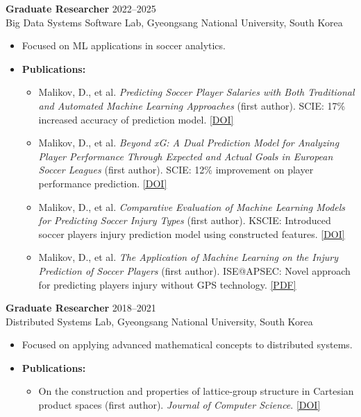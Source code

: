 \documentclass[11pt,a4paper]{article}
\begin{document}
\textbf{Graduate Researcher} \hfill 2022--2025 \\
Big Data Systems Software Lab, Gyeongsang National University, South Korea
\begin{itemize}
    \item Focused on ML applications in soccer analytics.
    \item \textbf{Publications:}
    \begin{itemize}
        \item Malikov, D., et al. \textit{Predicting Soccer Player Salaries with Both Traditional and Automated Machine Learning Approaches} (first author). SCIE: 17\% increased accuracy
of prediction model.
        \href{https://doi.org/10.3390/app15148108}{[DOI]}

        \item Malikov, D., et al. \textit{Beyond xG: A Dual Prediction Model for Analyzing Player Performance Through Expected and Actual Goals in European Soccer Leagues} (first author).
SCIE: 12\% improvement on player performance prediction.
        \href{https://doi.org/10.3390/app142210390}{[DOI]}

        \item Malikov, D., et al. \textit{Comparative Evaluation of Machine Learning Models for Predicting Soccer Injury Types} (first author). KSCIE: Introduced soccer players injury
prediction model using constructed features.
        \href{https://doi.org/10.21289/KSIC.2024.27.2.257}{[DOI]}

        \item Malikov, D., et al. \textit{The Application of Machine Learning on the Injury Prediction of
Soccer Players} (first author). ISE@APSEC: Novel approach for predicting players
injury without GPS technology.
        \href{https://ceur-ws.org/Vol-3362/ISE2022_short02_Malikov_Application.pdf}{[PDF]}
    \end{itemize}
\end{itemize}

\medskip

\textbf{Graduate Researcher} \hfill 2018--2021 \\
Distributed Systems Lab, Gyeongsang National University, South Korea
\begin{itemize}
    \item Focused on applying advanced mathematical concepts to distributed systems.
    \item \textbf{Publications:}
    \begin{itemize}
        \item On the construction and properties of lattice-group structure in Cartesian product
spaces (first author). \textit{Journal of Computer Science}.
        \href{https://doi.org/10.3844/jcssp.2020.402.421}{[DOI]}
    \end{itemize}
\end{itemize}
\end{document}
